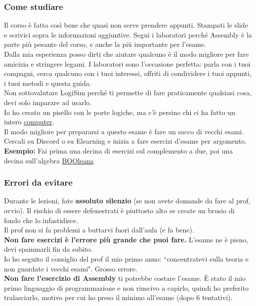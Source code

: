 \documentclass[18pt]{extarticle}
\begin{document}
\subsubsection{Come studiare}
Il corso è fatto così bene che quasi non serve prendere appunti. Stampati le slide e scrivici sopra le informazioni aggiuntive.
Segui i laboratori perché Assembly è la parte più pesante del corso, e anche la più importante per l'esame.\\
Dalla mia esperienza posso dirti che aiutare qualcuno è il modo migliore per fare amicizia e stringere legami. I laboratori sono l'occasione perfetta: parla con i tuoi compagni, cerca qualcuno con i tuoi interessi, offriti di condividere i tuoi appunti, i tuoi metodi e questa guida.\\
Non sottovalutare LogiSim perché ti permette di fare praticamente qualsiasi cosa, devi solo imparare ad usarlo.\\
Io ho creato un pisello con le porte logiche, ma c'è persino chi ci ha fatto un intero \href{https://www.youtube.com/watch?v=P5qwWGwHHO8}{computer}.\\
Il modo migliore per prepararsi a questo esame è fare un sacco di vecchi esami. Cercali su Discord o su Elearning e inizia a fare esercizi d'esame per argomento.\\
\textbf{Esempio:} Fai prima una decina di esercizi sul complemento a due, poi una decina sull'algebra \href{https://github.com/Verryx-02/Scuola-di-sopravvivenza-per-studenti-di-Informatica/blob/main/assets/Memini-carini-da-Programmer-Jokes/BOOlean-operators.jpeg}{BOOleana}

\subsubsection{Errori da evitare}
Durante le lezioni, fate \textbf{assoluto silenzio} (se non avete domande da fare al prof, ovvio). Il rischio di essere defenestrati è piuttosto alto se create un brusio di fondo che lo infastidisce.\\
Il prof non si fa problemi a buttarvi fuori dall'aula (e fa bene).\\
\textbf{Non fare esercizi è l'errore più grande che puoi fare.} L'esame ne è pieno, devi spammarli fin da subito.\\
Io ho seguito il consiglio del prof il mio primo anno: ``concentratevi sulla teoria e non guardate i vecchi esami". Grosso errore.\\
\textbf{Non fare l'esercizio di Assembly} ti potrebbe costare l'esame. È stato il mio primo linguaggio di programmazione e non riuscivo a capirlo, quindi ho preferito tralasciarlo, motivo per cui ho preso il minimo all'esame (dopo 6 tentativi).\\
\end{document}

